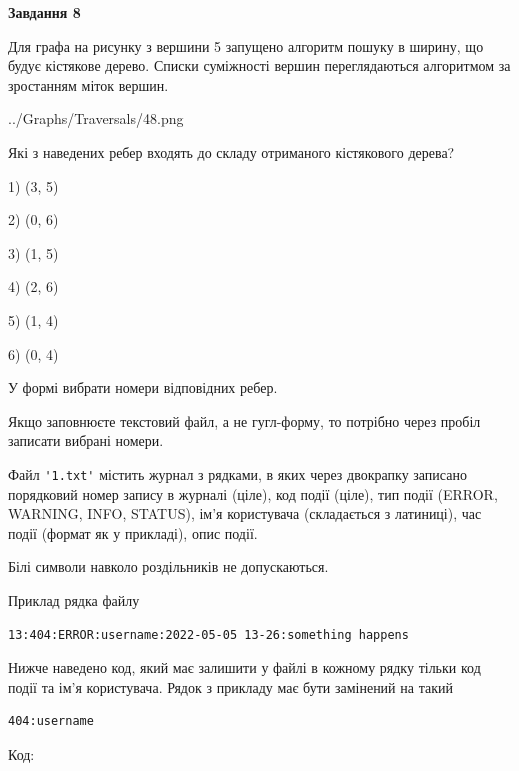 \documentclass[12pt, ukrainian]{article}
\def\code#1{\Verb!#1!}
\begin{document}
{\begin {large}
{\begin {center}\textbf{Завдання 8}\end {center}}\par
Для графа на рисунку з вершини 5 запущено алгоритм пошуку в ширину, що будує кістякове дерево. Списки суміжності вершин переглядаються алгоритмом за зростанням міток вершин.\par
\begin{center}
	{../Graphs/Traversals/48.png}
\end{center}
\par Які з наведених ребер входять до складу отриманого кістякового дерева?\par
1) (3, 5)\par
2) (0, 6)\par
3) (1, 5)\par
4) (2, 6)\par
5) (1, 4)\par
6) (0, 4)\par
{\vskip 15pt} У формі вибрати номери відповідних ребер.


Якщо заповнюєте текстовий файл, а не гугл-форму, то потрібно через пробіл записа\-ти вибрані номери.\par
\newpage


Файл \code{'1.txt'} містить журнал з рядками, в яких через двокрапку записано поряд\-ко\-вий номер запису в журналі (ціле), код події (ціле), тип події (ERROR, \\WARNING, INFO, STATUS), ім'я користувача (складається з латиниці), час події (фор\-мат як у прикладі), опис події.

Білі символи навколо роздільників не допускаються.

Приклад рядка файлу



\begin{verbatim}
13:404:ERROR:username:2022-05-05 13-26:something happens
\end{verbatim}


Нижче наведено код, який має залишити у файлі в кожному рядку тільки код події та ім'я користувача. Рядок з прикладу має бути замінений на такий



\begin{verbatim}
404:username
\end{verbatim}




Код:




\end{large}}
\end{document}
